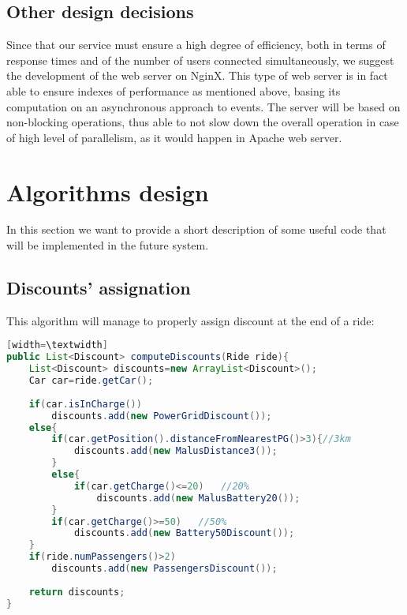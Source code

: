 \documentclass[10pt, a4paper,titlepage]{article}
\begin{document}
\subsection{Other design decisions}
Since that our service must ensure a high degree of efficiency, both in terms of response times and of the number of users connected simultaneously, we suggest the development of the web server on NginX.
This type of web server is in fact able to ensure indexes of performance as mentioned above, basing its computation on an asynchronous approach to events.
The server will be based on non-blocking operations, thus able to not slow down the overall operation in case of high level of parallelism, as it would happen in Apache web server.
\section{Algorithms design}
In this section we want to provide a short description of some useful code that will be implemented in the future system.
\subsection*{Discounts' assignation}
This algorithm will manage to properly assign discount at the end of a ride:
\begin{lstlisting}[language=Java][width=\textwidth]
public List<Discount> computeDiscounts(Ride ride){
    List<Discount> discounts=new ArrayList<Discount>();
    Car car=ride.getCar();
    
    if(car.isInCharge())
        discounts.add(new PowerGridDiscount());
    else{
        if(car.getPosition().distanceFromNearestPG()>3){//3km
            discounts.add(new MalusDistance3());
        }
        else{
            if(car.getCharge()<=20)   //20%
                discounts.add(new MalusBattery20());
        }
        if(car.getCharge()>=50)   //50%
            discounts.add(new Battery50Discount());
    }
    if(ride.numPassengers()>2)
        discounts.add(new PassengersDiscount());
        
    return discounts;
}
\end{lstlisting}
\bigskip
\bigskip
{}
\end{document}
